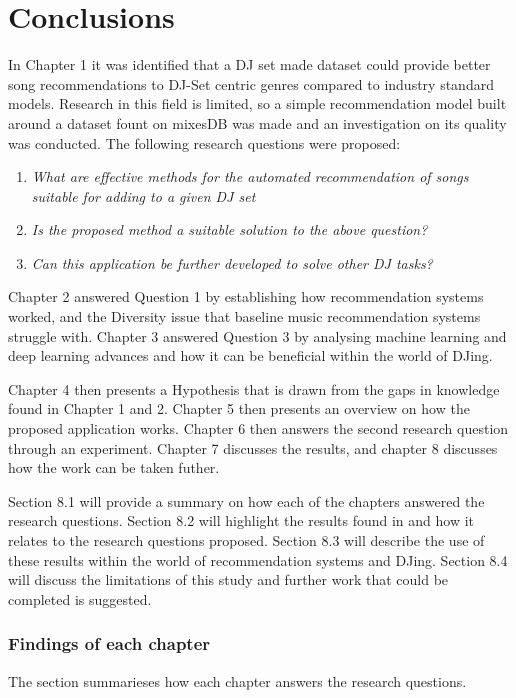 
\graphicspath{{Chapter7/}}

\chapter{Conclusions}

In Chapter 1 it was identified that a DJ set made dataset could provide better song recommendations to DJ-Set centric genres compared to industry standard models. Research in this field is limited, so a simple recommendation model built around a dataset fount on mixesDB was made and an investigation on its quality was conducted. The following research questions were proposed:

\begin{enumerate}
	\item \textit{What are effective methods for the automated recommendation of songs suitable
		for adding to a given DJ set}
	\item \textit{Is the proposed method a suitable solution to the above question?}
	\item \textit{Can this application be further developed to solve other DJ tasks?}
\end{enumerate}

Chapter 2 answered Question 1 by establishing how recommendation systems worked, and the Diversity issue that baseline music recommendation systems struggle with. Chapter 3 answered Question 3 by analysing machine learning and deep learning advances and how it can be beneficial within the world of DJing. 

Chapter 4 then presents a Hypothesis that is drawn from the gaps in knowledge found in Chapter 1 and 2. Chapter 5 then presents an overview on how the proposed application works. Chapter 6 then answers the second research question through an experiment. Chapter 7 discusses the results, and chapter 8 discusses how the work can be taken futher.

Section 8.1 will provide a summary on how each of the chapters answered the research questions.
Section 8.2 will highlight the results found in and how it relates to the research questions proposed. Section 8.3 will describe the use of these results within the world of  recommendation systems and DJing. Section 8.4 will discuss the limitations of
this  study and  further work that could be completed is suggested.

\subsection{Findings of each chapter}
The section summarieses how each chapter answers the research questions.

